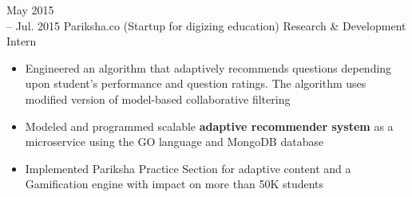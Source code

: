 \cventry
{May 2015\\-- Jul. 2015}
{Pariksha.co}
{(Startup for digizing education) Research \& Development Intern}
{}
{}
{
	\begin{itemize}
		\item {Engineered an algorithm that adaptively recommends questions depending upon student’s performance and question ratings. The algorithm uses modified version of model-based collaborative filtering}
		\item {Modeled and programmed scalable \textbf{adaptive recommender system} as a microservice using the GO language and MongoDB database }
		\item {Implemented Pariksha Practice Section for adaptive content and a Gamification engine with impact on more than 50K students}
	\end{itemize}
}